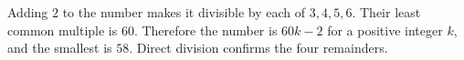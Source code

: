 Adding $2$ to the number makes it divisible by each of $3,4,5,6$. Their least common multiple is $60$. Therefore the number is $60k-2$ for a positive integer $k$, and the smallest is $\boxed{58}$. Direct division confirms the four remainders.
